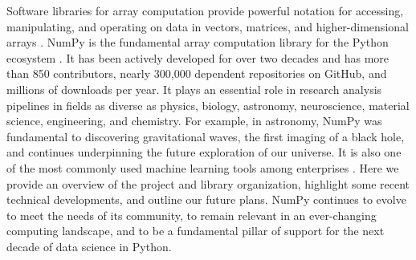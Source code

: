 




Software libraries for array computation provide powerful notation
for accessing, manipulating, and operating on data in vectors,
matrices, and higher-dimensional arrays \cite{iverson1980notation}.
NumPy is the fundamental array computation library for the Python ecosystem
\cite{dubois2007guest,oliphant2007python,millman2011python,perez2011python}.
It has been actively developed for over two decades and has more than 850
contributors, nearly 300,000 dependent repositories on GitHub, and millions of
downloads per year.
It plays an essential role in research analysis pipelines in fields as
diverse as physics, biology, astronomy, neuroscience, material science,
engineering, and chemistry.
For example, in astronomy, NumPy was fundamental to discovering gravitational
waves\cite{pycbc}, the first imaging of a black
hole\cite{eht-imaging}, and continues underpinning the future exploration of our universe\cite{jenness2018lsst}.
It is also one of the most commonly used machine learning tools among
enterprises \cite{451report2018}.
Here we provide an overview of the project and library organization, highlight
some recent technical developments, and outline our future plans.
NumPy continues to evolve to meet the needs of its community, to remain
relevant in an ever-changing computing landscape, and to be a fundamental
pillar of support for the next decade of data science in Python.
